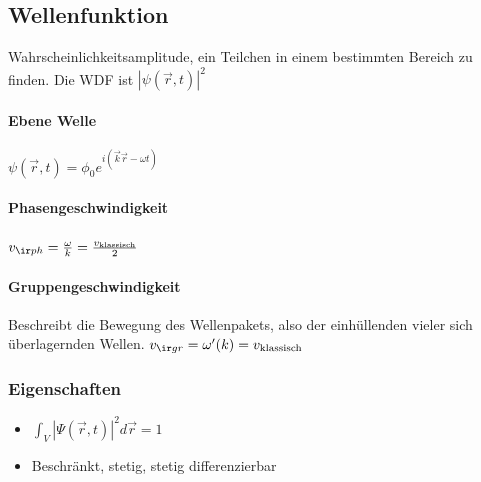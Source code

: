 \subsection{Wellenfunktion}
Wahrscheinlichkeitsamplitude, ein Teilchen in einem bestimmten Bereich zu finden. Die WDF ist $|\psi(\vec r, t)|^2$
\begin{sectionbox}
    \paragraph{Ebene Welle} $\psi(\vec r, t) = \phi_0e^{i(\vec k\vec r - \omega t)}$

    \paragraph{Phasengeschwindigkeit} $v_{\ir ph} = \frac{\omega}{k}=\frac{v_{\text{klassisch}}}{2}$
    \paragraph{Gruppengeschwindigkeit} Beschreibt die Bewegung des Wellenpakets, also der einhüllenden vieler sich überlagernden Wellen. $v_{\ir gr} = \omega'(k)=v_{\text{klassisch}}$
\end{sectionbox}

\begin{sectionbox}
    \subsubsection{Eigenschaften}
    \begin{itemize}
        \item $\int_V|\Psi(\vec r, t)|^2d\vec r = 1$
        \item Beschränkt, stetig, stetig differenzierbar
    \end{itemize}
\end{sectionbox}

